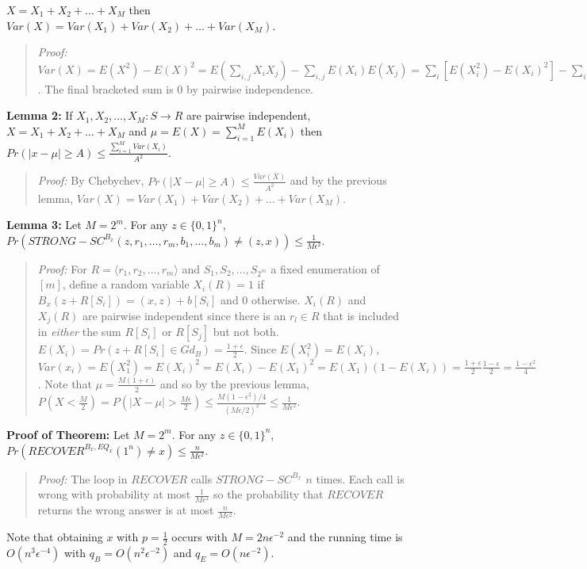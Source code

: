 $X= X_1 + X_2 + \ldots + X_M$ then
$Var(X)= Var(X_1) + Var(X_2 )+ \ldots + Var(X_M)$.
\begin{quote}
\emph{Proof:}
$Var(X)= E(X^2)-E(X)^2= 
E(\sum_{i,j} X_i X_j) -
\sum_{i,j} E(X_i) E(X_j)
= \sum_i [E(X_i^2) - E(X_i)^2]- \sum_{i\ne j} [E(X_i X_j)- E(X_i)E(X_j)]$.  The
final bracketed sum is $0$ by pairwise independence.
\end{quote}
{\bf Lemma 2:} If 
$X_1, X_2, \ldots , X_M: S \rightarrow R$ are pairwise independent, 
$X= X_1 + X_2 + \ldots + X_M$  and $\mu= E(X)= \sum_{i=1}^M E(X_i)$ then
$Pr(|x-\mu| \geq A) \leq {\frac {\sum_{i=1}^M Var(X_i)} {A^2}}$.
\begin{quote}
\emph{Proof:}
By Chebychev, $Pr(|X-\mu| \geq A) \leq {\frac  {Var(X)} {A^2}}$ and by the previous lemma,
$Var(X)= Var(X_1) + Var(X_2) + \ldots + Var(X_M)$.
\end{quote}
{\bf Lemma 3:} Let $M=2^m$.
For any $z \in \{0, 1\}^n$,
$Pr(STRONG-SC^{B_x}(z, r_1, \ldots, r_m, b_1, \ldots , b_m) 
\ne (z,x)) \leq {\frac 1 {M \epsilon^2}}$.
\begin{quote}
\emph{Proof:} For $R= \langle r_1, r_2, \ldots, r_m \rangle$ and $S_1, S_2, \ldots,
S_{2^m}$ a fixed enumeration of $[m]$, define a random variable $X_i(R)=1$ if
$B_x(z+R[S_i])= (x,z)+ b[S_i]$ and $0$ otherwise.  $X_i(R)$ and $X_j(R)$ are pairwise
independent since there is an $r_l \in R$ that is included in \emph{either} the sum
$R[S_i]$ or $R[S_j]$ but not both.  $E(X_i)= Pr(z+R[S_i] \in Gd_B)= {\frac {1 + \epsilon} 2}$.
Since $E(X_i^2)= E(X_i)$, $Var(x_i)= E(X_1^2)=E(X_i)^2= E(X_i)-E(X_1)^2= E(X_1)(1-E(X_i))=
{\frac {1+\epsilon} 2}
{\frac {1-\epsilon} 2} =
{\frac {1-\epsilon^2} 4} $.  Note that $\mu= {\frac {M(1+\epsilon)} 2}$ and so by the
previous lemma,  $P(X < {\frac {M} {2}}) =
P(|X-\mu| > {\frac {M \epsilon} {2}})  \leq
{\frac {M(1-\epsilon^2)/4} {(M \epsilon/2)^2}} \leq {\frac 1 {M \epsilon^2}}$.
\end{quote}
{\bf Proof of Theorem:} Let $M=2^m$.
For any $z \in \{0, 1\}^n$,
$Pr(RECOVER^{B_x, EQ_x}(1^n) \ne x) \leq {\frac n {M \epsilon^2}}$.
\begin{quote}
\emph{Proof:}
The loop in $RECOVER$ calls $STRONG-SC^{B_x}$ $n$ times.  Each call is wrong with 
probability at most ${\frac 1 {M \epsilon^2}}$ so the probability that $RECOVER$ returns
the wrong answer is at most
${\frac n {M \epsilon^2}}$.
\end{quote}
Note that obtaining $x$ with $p= {\frac 1 2}$ occurs with $M= 2n\epsilon^{-2}$ and the
running time is $O(n^3 \epsilon^{-4})$ with
$q_B= O(n^2 \epsilon^{-2})$ and
$q_E= O(n \epsilon^{-2})$.
